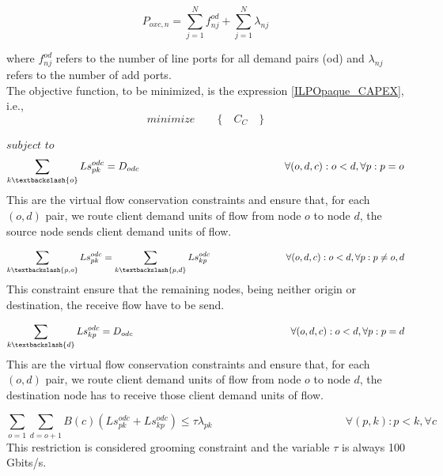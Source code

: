 \begin{equation}
P_{oxc,n} = \sum_{j=1}^{N} f_{nj}^{od} + \sum_{j=1}^{N} \lambda_{nj}
\label{OXC_poxc_transluc}
\end{equation}

\vspace{11pt}
\noindent
where $f_{nj}^{od}$ refers to the number of line ports for all demand pairs (od) and $\lambda_{nj}$ refers to the number of add ports.\\

The objective function, to be minimized, is the expression \ref{ILPOpaque_CAPEX}, i.e.,
\begin{equation*}
  minimize \qquad \Big\{ \quad C_C \quad \Big\}
\end{equation*}

$subject$ $to$
\begin{equation}
\sum_{k\textbackslash \{o\}} Ls_{pk}^{odc} = D_{odc} \qquad \qquad \qquad \qquad \qquad \qquad \qquad
\forall(o,d,c) : o < d, \forall p: p = o
\label{ILPTransluc1}
\end{equation}
\noindent
This are the virtual flow conservation constraints and ensure that, for each $(o,d)$ pair, we route client demand units of flow from node $o$ to node $d$, the source node sends client demand units of flow.

\begin{equation}
\sum_{k\textbackslash \{p,o\}} Ls_{pk}^{odc} = \sum_{k\textbackslash \{p,d\}} Ls_{kp}^{odc} \qquad \qquad \qquad \qquad
\forall(o,d,c) : o < d, \forall p: p \neq o,d
\label{ILPTransluc2}
\end{equation}
\noindent
This constraint ensure that the remaining nodes, being neither origin or destination, the receive flow have to be send.

\begin{equation}
\sum_{k\textbackslash \{d\}} Ls_{kp}^{odc} = D_{odc} \qquad \qquad \qquad \qquad \qquad \qquad \qquad \qquad
\forall(o,d,c) : o < d, \forall p: p = d
\label{ILPTransluc3}
\end{equation}
\noindent
This are the virtual flow conservation constraints and ensure that, for each $(o,d)$ pair, we route client demand units of flow from node $o$ to node $d$, the destination node has to receive those client demand units of flow.

\begin{equation}
\sum_{o=1} \sum_{d=o+1} B(c)(Ls_{pk}^{odc} + Ls_{kp}^{odc}) \leq  \tau \lambda_{pk} \qquad \qquad \qquad \qquad \qquad \qquad
\forall (p,k) : p < k, \forall c
\label{ILPTransluc4}
\end{equation}
\noindent
This restriction is considered grooming constraint and the variable $\tau$ is always 100 Gbits/s.

